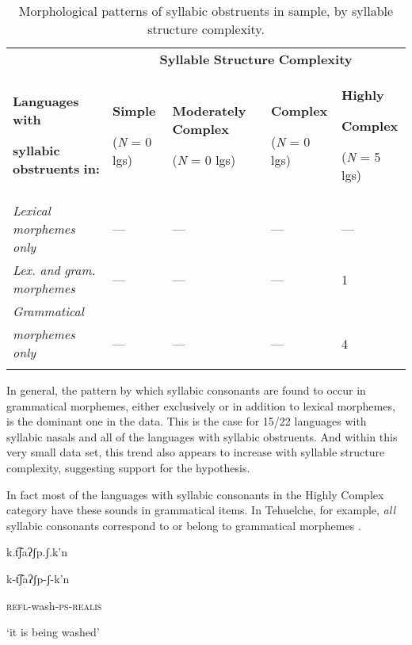 \begin{table}
\begin{tabularx}{\textwidth}{XXXXX}
 & \multicolumn{4}{c}{ \textbf{Syllable} \textbf{Structure} \textbf{Complexity}}\\
\lsptoprule
{ \textbf{Languages} \textbf{with} }

 \textbf{syllabic} \textbf{obstruents} \textbf{in:} & { \textbf{Simple}}

 (\textit{N} = 0 lgs) & { \textbf{Moderately} \textbf{Complex}}

 (\textit{N} = 0 lgs) & { \textbf{Complex}}

 (\textit{N} = 0 lgs) & { \textbf{Highly} }

{ \textbf{Complex}}

 (\textit{N} = 5 lgs)\\
 \textit{Lexical} \textit{morphemes} \textit{only} & — & — & — & —\\
 \textit{Lex.} \textit{and} \textit{gram.} \textit{morphemes} & — & — & — & 1\\
 \textit{Grammatical} \\
\textit{morphemes} \textit{only} & — & — & — & 4\\
\lspbottomrule
\end{tabularx}
\caption{\label{3.11}Morphological patterns of syllabic obstruents in sample, by syllable structure complexity.}
\end{table}

  In general, the pattern by which syllabic consonants are found to occur in grammatical morphemes, either exclusively or in addition to lexical morphemes, is the dominant one in the data. This is the case for 15/22 languages with syllabic nasals and all of the languages with syllabic obstruents. And within this very small data set, this trend also appears to increase with syllable structure complexity, suggesting support for the hypothesis. 

  In fact most of the languages with syllabic consonants in the Highly Complex category have these sounds in grammatical items. In Tehuelche, for example, \textit{all} syllabic consonants correspond to or belong to grammatical morphemes .

\ea\label{ex:(3.26)}

k.t͡ʃaʔʃp.ʃ.k’n

k-t͡ʃaʔʃp-ʃ-k’n

\textsc{refl}-wash-\textsc{ps-realis}

\glt ‘it is being washed’


